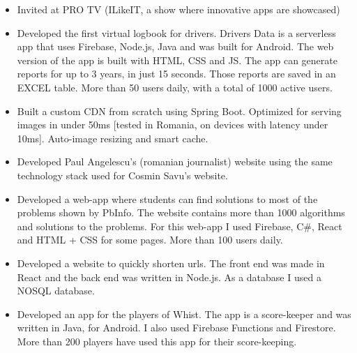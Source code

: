 \begin{itemize}
    \item Invited at PRO TV (ILikeIT, a show where innovative apps are showcased)
\end{itemize}

\begin{itemize}
    \item Developed the first virtual logbook for drivers. Drivers Data is a serverless app that uses Firebase, Node.js, Java and was built for Android. The web version of the app is built with HTML, CSS and JS. The app can generate reports for up to 3 years, in just 15 seconds. Those reports are saved in an EXCEL table. More than 50 users daily, with a total of 1000 active users.
\end{itemize}
\begin{itemize}
    \item Built a custom CDN from scratch using Spring Boot. Optimized for serving images in under 50ms [tested in Romania, on devices with latency under 10ms]. Auto-image resizing and smart cache.
\end{itemize}
\begin{itemize}
    \item Developed Paul Angelescu's (romanian journalist) website using the same technology stack used for Cosmin Savu's website.
\end{itemize}
\begin{itemize}
    \item Developed a web-app where students can find solutions to most of the problems shown by PbInfo. The website contains more than 1000 algorithms and solutions to the problems. For this web-app I used Firebase, C\#, React and HTML + CSS for some pages. More than 100 users daily.
\end{itemize}
\begin{itemize}
    \item Developed a website to quickly shorten urls. The front end was made in React and the back end was written in Node.js. As a database I used a NOSQL database.
\end{itemize}
\begin{itemize}
    \item Developed an app for the players of Whist. The app is a score-keeper and was written in Java, for Android. I also used Firebase Functions and Firestore. More than 200 players have used this app for their score-keeping.
\end{itemize}
